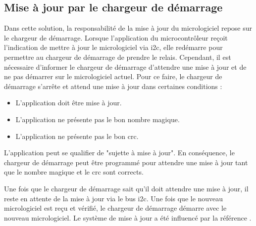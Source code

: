 \subsection{Mise à jour par le chargeur de démarrage}

Dans cette solution, la responsabilité de la mise à jour du micrologiciel repose sur le chargeur de démarrage.
Lorsque l'application du microcontrôleur reçoit l'indication de mettre à jour le micrologiciel via \gls{i2c}, elle redémarre pour permettre au chargeur de démarrage de prendre le relais.
Cependant, il est nécessaire d'informer le chargeur de démarrage d'attendre une mise à jour et de ne pas démarrer sur le micrologiciel actuel.
Pour ce faire, le chargeur de démarrage s'arrête et attend une mise à jour dans certaines conditions :

\begin{itemize}
    \item L'application doit être mise à jour.
    \item L'application ne présente pas le bon nombre magique.
    \item L'application ne présente pas le bon \gls{crc}.
\end{itemize}

L'application peut se qualifier de "sujette à mise à jour".
En conséquence, le chargeur de démarrage peut être programmé pour attendre une mise à jour tant que le nombre magique et le \gls{crc} sont corrects.

Une fois que le chargeur de démarrage sait qu'il doit attendre une mise à jour, il reste en attente de la mise à jour via le bus \gls{i2c}.
Une fois que le nouveau micrologiciel est reçu et vérifié, le chargeur de démarrage démarre avec le nouveau micrologiciel.
Le système de mise à jour a été influencé par la référence \cite{reindl2020software}.

